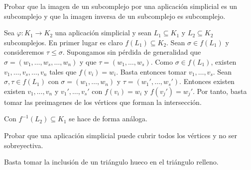 \documentclass[twoside]{article}
\begin{document}
\begin{ejercicio}{1.15}
Probar que la imagen de un subcomplejo por una aplicación simplicial es un subcomplejo y que la imagen inversa de un subcomplejo es subcomplejo.
\end{ejercicio}
\begin{solucion}
Sea $\varphi:K_1\to K_2$ una aplicación simplicial y sean $L_1\subseteq K_1$ y $L_2\subseteq K_2$ subcomplejos. En primer lugar es claro $f(L_1)\subseteq K_2$. Sean $\sigma\in f(L_1)$ y consideremos $\tau\leq\sigma$. Supongamos sin pérdida de generalidad que $\sigma=(w_1,\dots, w_s, \dots, w_n)$ y que $\tau=(w_1,\dots, w_s)$. Como $\sigma\in f(L_1)$, existen $v_1,\dots, v_s,\dots, v_n$ tales que $f(v_i)=w_i$. Basta entonces tomar $v_1,\dots, v_s$. Sean $\sigma,\tau\in f(L_1)$ con $\sigma=(w_1,\dots, w_n)$ y $\tau=(w_1',\dots, w_s')$. Entonces existen existen $v_1,\dots, v_n$ y $v_1',\dots, v_s'$ con $f(v_i)=w_i$ y $f(v_j')=w_j'$. Por tanto, basta tomar las preimagenes de los vértices que forman la intersección.

Con $f^{-1}(L_2)\subseteq K_1$ se hace de forma análoga.
\end{solucion}

\newpage

\begin{ejercicio}{1.16}
Probar que una aplicación simplicial puede cubrir todos los vértices y no ser sobreyectiva.
\end{ejercicio}
\begin{solucion}
Basta tomar la inclusión de un triángulo hueco en el triángulo relleno.
\end{solucion}

\newpage
\end{document}
